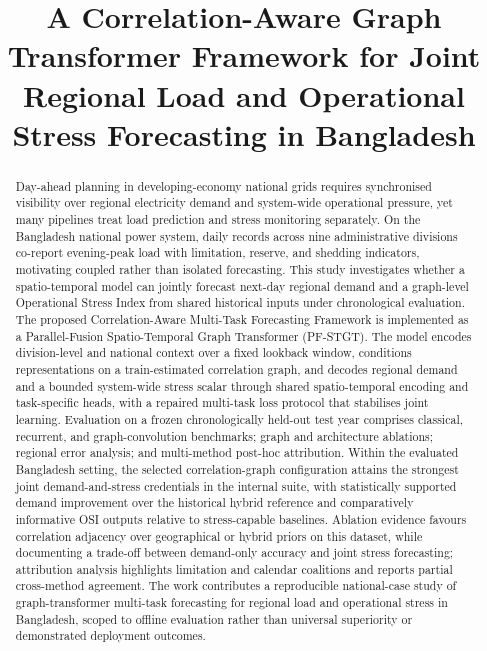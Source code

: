 \documentclass[conference]{IEEEtran}
\begin{document}
\title{A Correlation-Aware Graph Transformer Framework for Joint Regional Load and Operational Stress Forecasting in Bangladesh}

\author{
}

\maketitle

\begin{abstract}
Day-ahead planning in developing-economy national grids requires synchronised visibility over regional electricity demand and system-wide operational pressure, yet many pipelines treat load prediction and stress monitoring separately. On the Bangladesh national power system, daily records across nine administrative divisions co-report evening-peak load with limitation, reserve, and shedding indicators, motivating coupled rather than isolated forecasting. This study investigates whether a spatio-temporal model can jointly forecast next-day regional demand and a graph-level Operational Stress Index from shared historical inputs under chronological evaluation. The proposed Correlation-Aware Multi-Task Forecasting Framework is implemented as a Parallel-Fusion Spatio-Temporal Graph Transformer (PF-STGT). The model encodes division-level and national context over a fixed lookback window, conditions representations on a train-estimated correlation graph, and decodes regional demand and a bounded system-wide stress scalar through shared spatio-temporal encoding and task-specific heads, with a repaired multi-task loss protocol that stabilises joint learning. Evaluation on a frozen chronologically held-out test year comprises classical, recurrent, and graph-convolution benchmarks; graph and architecture ablations; regional error analysis; and multi-method post-hoc attribution. Within the evaluated Bangladesh setting, the selected correlation-graph configuration attains the strongest joint demand-and-stress credentials in the internal suite, with statistically supported demand improvement over the historical hybrid reference and comparatively informative OSI outputs relative to stress-capable baselines. Ablation evidence favours correlation adjacency over geographical or hybrid priors on this dataset, while documenting a trade-off between demand-only accuracy and joint stress forecasting; attribution analysis highlights limitation and calendar coalitions and reports partial cross-method agreement. The work contributes a reproducible national-case study of graph-transformer multi-task forecasting for regional load and operational stress in Bangladesh, scoped to offline evaluation rather than universal superiority or demonstrated deployment outcomes.
\end{abstract}
\end{document}
